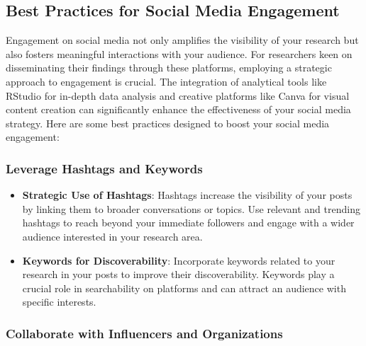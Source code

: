 \documentclass[
]{book}
\begin{document}
\hypertarget{best-practices-for-social-media-engagement}{%
\subsection*{Best Practices for Social Media Engagement}\label{best-practices-for-social-media-engagement}}

Engagement on social media not only amplifies the visibility of your research but also fosters meaningful interactions with your audience. For researchers keen on disseminating their findings through these platforms, employing a strategic approach to engagement is crucial. The integration of analytical tools like RStudio for in-depth data analysis and creative platforms like Canva for visual content creation can significantly enhance the effectiveness of your social media strategy. Here are some best practices designed to boost your social media engagement:

\hypertarget{leverage-hashtags-and-keywords}{%
\subsubsection*{Leverage Hashtags and Keywords}\label{leverage-hashtags-and-keywords}}

\begin{itemize}
\item
  \textbf{Strategic Use of Hashtags}: Hashtags increase the visibility of your posts by linking them to broader conversations or topics. Use relevant and trending hashtags to reach beyond your immediate followers and engage with a wider audience interested in your research area.
\item
  \textbf{Keywords for Discoverability}: Incorporate keywords related to your research in your posts to improve their discoverability. Keywords play a crucial role in searchability on platforms and can attract an audience with specific interests.
\end{itemize}

\hypertarget{collaborate-with-influencers-and-organizations}{%
\subsubsection*{Collaborate with Influencers and Organizations}\label{collaborate-with-influencers-and-organizations}}
\end{document}
